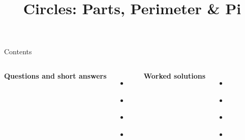 \documentclass{beamer}
\title{Circles: Parts, Perimeter \& Pi}
\author{}
\date{}
\begin{document}
\frame{\titlepage}

\begin{frame}{Contents}
\small
\begin{columns}[T]
\textbf{Questions and short answers}
\begin{itemize}
  \item \hyperlink{q-st1}{}
  \item \hyperlink{q-st2}{}
  \item \hyperlink{q-st3}{}
  \item \hyperlink{q-st4}{}
\end{itemize}
\textbf{Worked solutions}
\begin{itemize}
  \item \hyperlink{work-st1}{}
  \item \hyperlink{work-st2}{}
  \item \hyperlink{work-st3}{}
  \item \hyperlink{work-st4}{}
\end{itemize}
\end{columns}
\end{frame}
\end{document}
